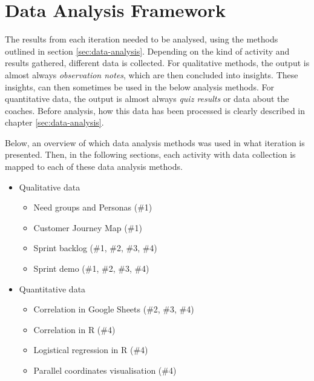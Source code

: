 \section{Data Analysis Framework}




The results from each iteration needed to be analysed, using the methods outlined in section \ref{sec:data-analysis}. Depending on the kind of activity and results gathered, different data is collected. For qualitative methods, the output is almost always \textit{observation notes}, which are then concluded into insights. These insights, can then sometimes be used in the below analysis methods. For quantitative data, the output is almost always \textit{quiz results} or data about the coaches. Before analysis, how this data has been processed is clearly described in chapter \ref{sec:data-analysis}.

Below, an overview of which data analysis methods was used in what iteration is presented. Then, in the following sections, each activity with data collection is mapped to each of these data analysis methods.

\begin{itemize}
\item Qualitative data
\begin{itemize}
\item Need groups and Personas (\#1)
\item Customer Journey Map (\#1)
\item Sprint backlog (\#1, \#2, \#3, \#4)
\item Sprint demo (\#1, \#2, \#3, \#4)
\end{itemize}
\item Quantitative data
\begin{itemize}
\item Correlation in Google Sheets (\#2, \#3, \#4)
\item Correlation in R (\#4)
\item Logistical regression in R (\#4)
\item Parallel coordinates visualisation (\#4)
\end{itemize}
\end{itemize}

